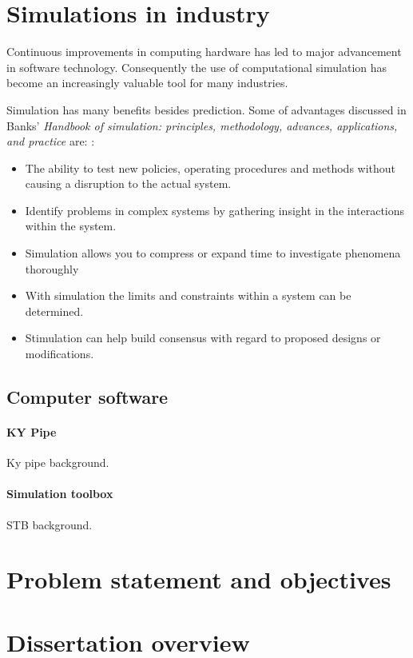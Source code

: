 \section{Simulations in industry}

Continuous improvements in computing hardware has led to major advancement in software technology. Consequently the use of computational simulation has become an increasingly valuable tool for many industries.\cite{kocsis2003integration} \par 

Simulation has many benefits besides prediction. Some of advantages discussed in Banks' \textit{ Handbook of simulation: principles, methodology, advances, applications, and practice} are: \cite{banks1998handbook}:
\begin{itemize}
	\item The ability to test new policies, operating procedures and methods without causing a disruption to the actual system.
	\item Identify problems in complex systems by gathering insight in the interactions within the system.
	\item Simulation allows you to compress or expand time to investigate phenomena thoroughly
	\item With simulation the limits and constraints within a system can be determined.
	\item Stimulation can help build consensus with regard to proposed designs or modifications.
\end{itemize}

\subsection{Computer software}
\paragraph{KY Pipe}
Ky pipe background. \cite{Wood1993KYPipe}
\paragraph{Simulation toolbox}
STB background.
\section{Problem statement and objectives}
\section{Dissertation overview}